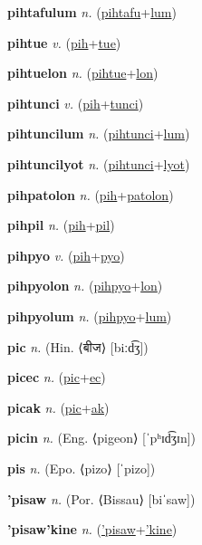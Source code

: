 \textbf{\hypertarget{pihtafulum}{pihtafulum}} \textit{n.} (\hyperlink{pihtafu}{pihtafu}+\allowbreak \hyperlink{lum}{lum})


\textbf{\hypertarget{pihtue}{pihtue}} \textit{v.} (\hyperlink{pih}{pih}+\allowbreak \hyperlink{tue}{tue})


\textbf{\hypertarget{pihtuelon}{pihtuelon}} \textit{n.} (\hyperlink{pihtue}{pihtue}+\allowbreak \hyperlink{lon}{lon})


\textbf{\hypertarget{pihtunci}{pihtunci}} \textit{v.} (\hyperlink{pih}{pih}+\allowbreak \hyperlink{tunci}{tunci})


\textbf{\hypertarget{pihtuncilum}{pihtuncilum}} \textit{n.} (\hyperlink{pihtunci}{pihtunci}+\allowbreak \hyperlink{lum}{lum})


\textbf{\hypertarget{pihtuncilyot}{pihtuncilyot}} \textit{n.} (\hyperlink{pihtunci}{pihtunci}+\allowbreak \hyperlink{lyot}{lyot})


\textbf{\hypertarget{pihpatolon}{pihpatolon}} \textit{n.} (\hyperlink{pih}{pih}+\allowbreak \hyperlink{patolon}{patolon})


\textbf{\hypertarget{pihpil}{pihpil}} \textit{n.} (\hyperlink{pih}{pih}+\allowbreak \hyperlink{pil}{pil})


\textbf{\hypertarget{pihpyo}{pihpyo}} \textit{v.} (\hyperlink{pih}{pih}+\allowbreak \hyperlink{pyo}{pyo})


\textbf{\hypertarget{pihpyolon}{pihpyolon}} \textit{n.} (\hyperlink{pihpyo}{pihpyo}+\allowbreak \hyperlink{lon}{lon})


\textbf{\hypertarget{pihpyolum}{pihpyolum}} \textit{n.} (\hyperlink{pihpyo}{pihpyo}+\allowbreak \hyperlink{lum}{lum})


\textbf{\hypertarget{pic}{pic}} \textit{n.} (Hin. ⟨{\devanagari{}बीज}⟩ [biːd͡ʒ])


\textbf{\hypertarget{picec}{picec}} \textit{n.} (\hyperlink{pic}{pic}+\allowbreak \hyperlink{ec}{ec})


\textbf{\hypertarget{picak}{picak}} \textit{n.} (\hyperlink{pic}{pic}+\allowbreak \hyperlink{ak}{ak})


\textbf{\hypertarget{picin}{picin}} \textit{n.} (Eng. ⟨pigeon⟩ [ˈpʰɪd͡ʒɪn])


\textbf{\hypertarget{pis}{pis}} \textit{n.} (Epo. ⟨pizo⟩ [ˈpizo])


\textbf{\hypertarget{'pisaw}{'pisaw}} \textit{n.} (Por. ⟨Bissau⟩ [biˈsaw])


\textbf{\hypertarget{'pisaw'kine}{'pisaw'kine}} \textit{n.} (\hyperlink{'pisaw}{'pisaw}+\allowbreak \hyperlink{'kine}{'kine})


